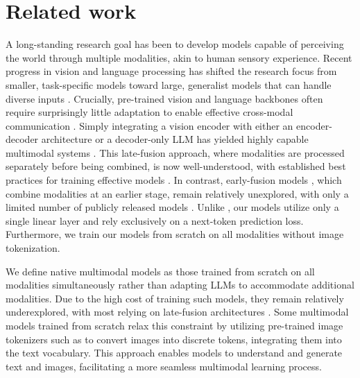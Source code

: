 \section{Related work}


 A long-standing research goal has been to develop models capable of perceiving the world through multiple modalities, akin to human sensory experience.  Recent progress in vision and language processing has shifted the research focus from smaller, task-specific models toward large, generalist models that can handle diverse inputs \citep{team2023gemini,hurst2024gpt4o}.  Crucially, pre-trained vision and language backbones often require surprisingly little adaptation to enable effective cross-modal communication \citep{tsimpoukelli2021multimodalfrozen,shukor2023epalm,vallaeys2024improveddepalm,merullo2023linearly,koh2023grounding}.  Simply integrating a vision encoder with either an encoder-decoder architecture \citep{shukor2023unival,wang2022ofa,lu2022unified,mizrahi20234m} or a decoder-only LLM has yielded highly capable multimodal systems \citep{laurenccon2024mattersidefics2,alayrac2022flamingo,liu2024improvedllava,wang2024qwen2,xue2024xgenblip3,chen2024internvl,zhu2024minigpt,abdin2024phi3,dai2024nvlm,beyer2024paligemma,moon2024anymal}. This late-fusion approach, where modalities are processed separately before being combined, is now well-understood, with established best practices for training effective models \citep{laurenccon2024obelics,mckinzie2025mm1,zhang2024mm1_5,lin2024vila}.  In contrast, early-fusion models \citep{fuyu8b,team2024chameleon,diao2024unveiling}, which combine modalities at an earlier stage, remain relatively unexplored, with only a limited number of publicly released models \citep{fuyu8b,diao2024unveiling}.  Unlike \citep{diao2024unveiling,team2024chameleon}, our models utilize only a single linear layer and rely exclusively on a next-token prediction loss. Furthermore, we train our models from scratch on all modalities without image tokenization.


 We define native multimodal models as those trained from scratch on all modalities simultaneously \citep{team2023gemini} rather than adapting LLMs to accommodate additional modalities. Due to the high cost of training such models, they remain relatively underexplored, with most relying on late-fusion architectures \citep{kosmoshuang2023language,yu2022coca}. Some multimodal models trained from scratch \citep{aghajanyan2022cm3,team2024chameleon,wang2024emu3} relax this constraint by utilizing pre-trained image tokenizers such as \citep{vqgan,vqvae} to convert images into discrete tokens, integrating them into the text vocabulary. This approach enables models to understand and generate text and images, facilitating a more seamless multimodal learning process.

